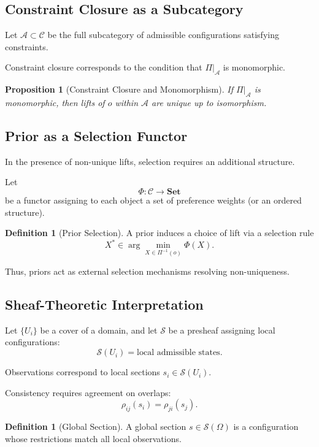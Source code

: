 \documentclass[12pt, oneside]{article}
\theoremstyle{plain}
\newtheorem{proposition}[theorem]{Proposition}
\theoremstyle{definition}
\newtheorem{definition}[theorem]{Definition}
\theoremstyle{remark}
\begin{document}
\subsection{Constraint Closure as a Subcategory}

Let $\mathcal{A} \subset \mathcal{C}$ be the full subcategory of admissible configurations satisfying constraints.

Constraint closure corresponds to the condition that $\Pi|_{\mathcal{A}}$ is monomorphic.

\begin{proposition}[Constraint Closure and Monomorphism]
If $\Pi|_{\mathcal{A}}$ is monomorphic, then lifts of $o$ within $\mathcal{A}$ are unique up to isomorphism.
\end{proposition}

\subsection{Prior as a Selection Functor}

In the presence of non-unique lifts, selection requires an additional structure.

Let
\[
\Phi : \mathcal{C} \to \mathbf{Set}
\]
be a functor assigning to each object a set of preference weights (or an ordered structure).

\begin{definition}[Prior Selection]
A prior induces a choice of lift via a selection rule
\[
X^* \in \arg\min_{X \in \Pi^{-1}(o)} \Phi(X).
\]
\end{definition}

Thus, priors act as external selection mechanisms resolving non-uniqueness.

\subsection{Sheaf-Theoretic Interpretation}

Let $\{U_i\}$ be a cover of a domain, and let $\mathcal{S}$ be a presheaf assigning local configurations:
\[
\mathcal{S}(U_i) = \text{local admissible states}.
\]

Observations correspond to local sections $s_i \in \mathcal{S}(U_i)$.

Consistency requires agreement on overlaps:
\[
\rho_{ij}(s_i) = \rho_{ji}(s_j).
\]

\begin{definition}[Global Section]
A global section $s \in \mathcal{S}(\Omega)$ is a configuration whose restrictions match all local observations.
\end{definition}
\end{document}

